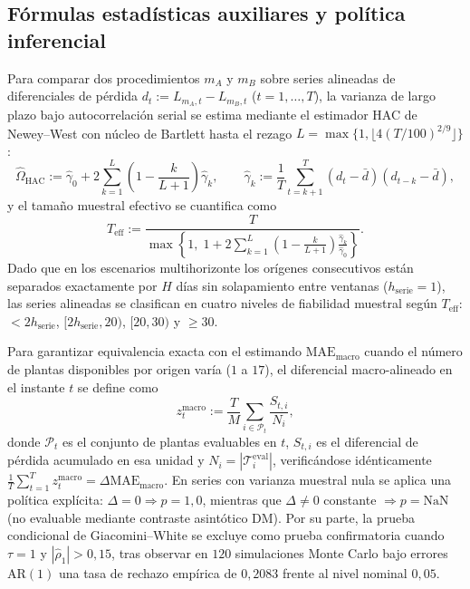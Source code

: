\documentclass[11pt,a4paper]{article}
\begin{document}
\subsection{Fórmulas estadísticas auxiliares y política inferencial}\label{sup:stats}

Para comparar dos procedimientos $m_A$ y $m_B$ sobre series alineadas de diferenciales de pérdida $d_t := L_{m_A, t} - L_{m_B, t}$ ($t = 1,\dots,T$), la varianza de largo plazo bajo autocorrelación serial se estima mediante el estimador HAC de Newey--West \cite{newey1987} con núcleo de Bartlett hasta el rezago $L = \max\{1, \lfloor 4(T/100)^{2/9} \rfloor\}$:
\begin{equation}
\hat{\Omega}_{\mathrm{HAC}} := \hat{\gamma}_0 + 2\sum_{k=1}^{L}\left(1 - \frac{k}{L+1}\right)\hat{\gamma}_k, \qquad
\hat{\gamma}_k := \frac{1}{T}\sum_{t=k+1}^{T}(d_t - \bar{d})(d_{t-k} - \bar{d}),
\label{eq:sup_hac}
\end{equation}
y el tamaño muestral efectivo se cuantifica como
\begin{equation}
T_{\mathrm{eff}} := \frac{T}{\max\!\left\{1,\; 1 + 2\sum_{k=1}^{L}\left(1 - \frac{k}{L+1}\right)\frac{\hat{\gamma}_k}{\hat{\gamma}_0}\right\}}.
\label{eq:sup_teff}
\end{equation}
Dado que en los escenarios multihorizonte los orígenes consecutivos están separados exactamente por $H$ días sin solapamiento entre ventanas ($h_{\mathrm{serie}} = 1$), las series alineadas se clasifican en cuatro niveles de fiabilidad muestral según $T_{\mathrm{eff}}$: $<2h_{\mathrm{serie}}$, $[2h_{\mathrm{serie}}, 20)$, $[20, 30)$ y $\ge 30$.

Para garantizar equivalencia exacta con el estimando $\mathrm{MAE}_{\mathrm{macro}}$ cuando el número de plantas disponibles por origen varía ($1$ a $17$), el diferencial macro-alineado en el instante $t$ se define como
\begin{equation}
z_t^{\mathrm{macro}} := \frac{T}{M}\sum_{i \in \mathcal{P}_t} \frac{S_{t,i}}{N_i},
\label{eq:sup_zmacro}
\end{equation}
donde $\mathcal{P}_t$ es el conjunto de plantas evaluables en $t$, $S_{t,i}$ es el diferencial de pérdida acumulado en esa unidad y $N_i = |\mathcal{T}_i^{\mathrm{eval}}|$, verificándose idénticamente $\frac{1}{T}\sum_{t=1}^T z_t^{\mathrm{macro}} = \Delta\mathrm{MAE}_{\mathrm{macro}}$. En series con varianza muestral nula se aplica una política explícita: $\Delta = 0 \Rightarrow p = 1{,}0$, mientras que $\Delta \ne 0$ constante $\Rightarrow p = \text{NaN}$ (no evaluable mediante contraste asintótico DM). Por su parte, la prueba condicional de Giacomini--White \cite{giacomini2006tests} se excluye como prueba confirmatoria cuando $\tau = 1$ y $|\hat{\rho}_1| > 0{,}15$, tras observar en $120$ simulaciones Monte Carlo bajo errores $\mathrm{AR}(1)$ una tasa de rechazo empírica de $0{,}2083$ frente al nivel nominal $0{,}05$.
\end{document}

